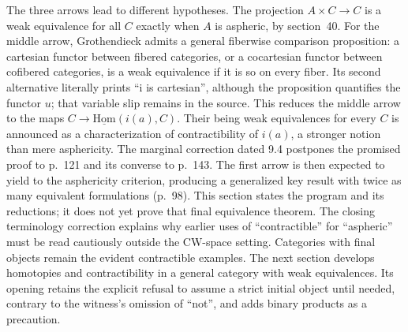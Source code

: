 The three arrows lead to different hypotheses. The projection $A\times C\to C$ is a weak equivalence for all $C$ exactly when $A$ is aspheric, by section~40. For the middle arrow, Grothendieck admits a general fiberwise comparison proposition: a cartesian functor between fibered categories, or a cocartesian functor between cofibered categories, is a weak equivalence if it is so on every fiber. Its second alternative literally prints ``i is cartesian'', although the proposition quantifies the functor $u$; that variable slip remains in the source. This reduces the middle arrow to the maps $C\to\underline{\mathrm{Hom}}(i(a),C)$. Their being weak equivalences for every $C$ is announced as a characterization of contractibility of $i(a)$, a stronger notion than mere asphericity. The marginal correction dated 9.4 postpones the promised proof to p.~121 and its converse to p.~143. The first arrow is then expected to yield to the asphericity criterion, producing a generalized key result with twice as many equivalent formulations (p.~98). This section states the program and its reductions; it does not yet prove that final equivalence theorem. The closing terminology correction explains why earlier uses of ``contractible'' for ``aspheric'' must be read cautiously outside the CW-space setting. Categories with final objects remain the evident contractible examples. The next section develops homotopies and contractibility in a general category with weak equivalences. Its opening retains the explicit refusal to assume a strict initial object until needed, contrary to the witness's omission of ``not'', and adds binary products as a precaution.

